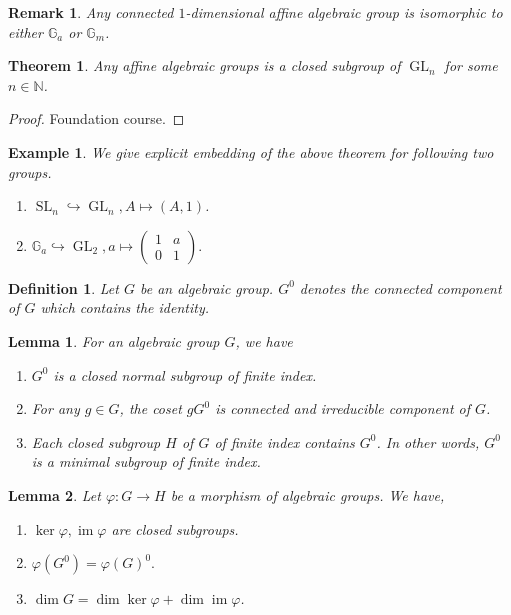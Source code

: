 \documentclass[10pt]{article}
\newtheorem{theorem}{Theorem} [section]
\newtheorem{definition}{Definition}[section]
\newtheorem{lemma}{Lemma}[section]
\newtheorem{remark}{Remark}[section]
\newtheorem{example}{Example}[section]
\numberwithin{equation}{theorem}
\DeclareMathOperator{\GL}{GL}
\DeclareMathOperator{\SL}{SL}
\DeclareMathOperator{\Ker}{ker}
\DeclareMathOperator{\Image}{im}
\newcommand{\N}[0]{\mathbb{N}}
\newcommand{\G}[0]{\mathbb{G}}
\begin{document}
\begin{remark}
  Any connected $1$-dimensional affine algebraic group is isomorphic to either $\G_a$ or $\G_m$. 
\end{remark}

\begin{theorem}
  Any affine algebraic groups is a closed subgroup of $\GL_n$ for some $n\in \N$.
\end{theorem}
\begin{proof}
  Foundation course.
\end{proof}

\begin{example}
  We give explicit embedding of the above theorem for following two groups.
  \begin{enumerate}
    \item $\SL_n\hookrightarrow\GL_n,A\mapsto(A,1)$.
    \item $\G_a\hookrightarrow\GL_2,a\mapsto\begin{pmatrix}
      1&a\\ 0&1
    \end{pmatrix}.$
  \end{enumerate}
\end{example}
\begin{definition}
  Let $G$ be an algebraic group. $G^0$ denotes the connected component of $G$ which contains the identity.
\end{definition}

\begin{lemma}
For an algebraic group $G$, we have
\begin{enumerate}[1).]
  \item $G^0$ is a closed normal subgroup of finite index.
  \item For any $g\in G$, the coset $gG^0$ is connected and irreducible component of $G$.
  \item Each closed subgroup $H$ of $G$ of finite index contains $G^0$. In other words, $G^0$ is a minimal subgroup of finite index.
\end{enumerate}
\end{lemma}

\begin{lemma}
  Let $\varphi:G\to H$ be a morphism of algebraic groups. We have,
  \begin{enumerate}[1).]
    \item $\Ker\varphi,\Image\varphi$ are closed subgroups.
    \item $\varphi(G^0) = \varphi(G)^0.$
    \item $\dim G = \dim\Ker\varphi+\dim\Image\varphi$.
  \end{enumerate}
\end{lemma}
\end{document}
